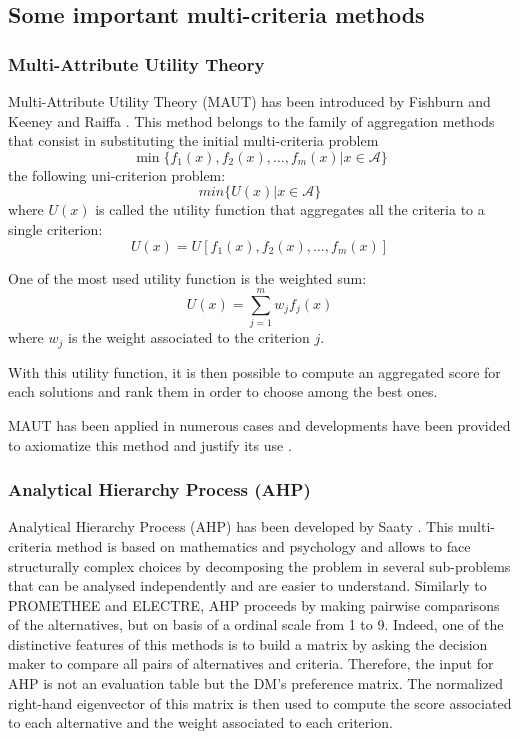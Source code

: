 \subsection{Some important multi-criteria methods}
\label{subsec:mcdamethods}

\subsubsection{Multi-Attribute Utility Theory}
Multi-Attribute Utility Theory (MAUT) has been introduced by Fishburn \cite{Fishburn70} and Keeney and Raiffa \cite{KeeneyRaiffa76}. This method belongs to the family of aggregation methods that consist in substituting the initial multi-criteria problem
\begin{equation}
\min \{f_1(x), f_2(x), \dots, f_m(x) | x \in \mathcal{A}\}
\end{equation}
the following uni-criterion problem:
\begin{equation}
min \{U(x) | x \in \mathcal{A}\}
\end{equation}
where $U(x)$ is called the utility function that aggregates all the criteria to a single criterion:
\begin{equation}
U(x) = U[f_1(x), f_2(x), \dots, f_m(x)]
\end{equation}

One of the most used utility function is the weighted sum:
\begin{equation}
U(x) = \sum_{j=1}^{m} w_j f_j(x)
\end{equation}
where $w_j$ is the weight associated to the criterion $j$.

With this utility function, it is then possible to compute an aggregated score for each solutions and rank them in order to choose among the best ones.

MAUT has been applied in numerous cases and developments have been provided to axiomatize this method and justify its use \cite{MMAUT}.

\subsubsection{Analytical Hierarchy Process (AHP)}
Analytical Hierarchy Process (AHP) has been developed by Saaty \cite{MAHP}. This multi-criteria method is based on mathematics and psychology and allows to face structurally complex choices by decomposing the problem in several sub-problems that can be analysed independently and are easier to understand. Similarly to PROMETHEE and ELECTRE, AHP proceeds by making pairwise comparisons of the alternatives, but on basis of a ordinal scale from 1 to 9. Indeed, one of the distinctive features of this methods is to build a matrix by asking the decision maker to compare all pairs of alternatives and criteria. Therefore, the input for AHP is not an evaluation table but the DM's preference matrix. The normalized right-hand eigenvector of this matrix is then used to compute the score associated to each alternative and the weight associated to each criterion. 

